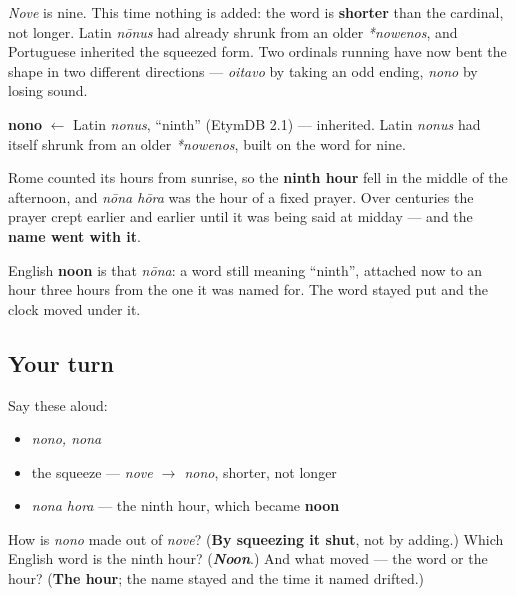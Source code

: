 \emph{Nove} is nine. This time nothing is added: the word is \textbf{shorter} than the cardinal, not longer. Latin \emph{nōnus} had already shrunk from an older \emph{*nowenos}, and Portuguese inherited the squeezed form. Two ordinals running have now bent the shape in two different directions — \emph{oitavo} by taking an odd ending, \emph{nono} by losing sound.

\begin{cousinweb}
\textbf{nono} $\leftarrow$ Latin \emph{nonus}, \textquotedblleft{}ninth\textquotedblright{} (EtymDB 2.1) — inherited. Latin \emph{nonus} had itself shrunk from an older \emph{*nowenos}, built on the word for nine.
\end{cousinweb}

\begin{culture}
Rome counted its hours from sunrise, so the \textbf{ninth hour} fell in the middle of the afternoon, and \emph{nōna hōra} was the hour of a fixed prayer. Over centuries the prayer crept earlier and earlier until it was being said at midday — and the \textbf{name went with it}.

English \textbf{noon} is that \emph{nōna}: a word still meaning \textquotedblleft{}ninth\textquotedblright{}, attached now to an hour three hours from the one it was named for. The word stayed put and the clock moved under it.
\end{culture}

\subsection*{Your turn}
Say these aloud:

\begin{itemize}
\raggedright
  \item \emph{nono, nona}
  \item the squeeze — \emph{nove $\to$ nono}, shorter, not longer
  \item \emph{nona hora} — the ninth hour, which became \textbf{noon}
\end{itemize}

\begin{tcolorbox}[breakable,colback=teal!4,colframe=teal!35!black,title={Before you move on}]
How is \emph{nono} made out of \emph{nove}? (\textbf{By squeezing it shut}, not by adding.) Which English word is the ninth hour? (\emph{\textbf{Noon}}.) And what moved — the word or the hour? (\textbf{The hour}; the name stayed and the time it named drifted.)
\end{tcolorbox}
